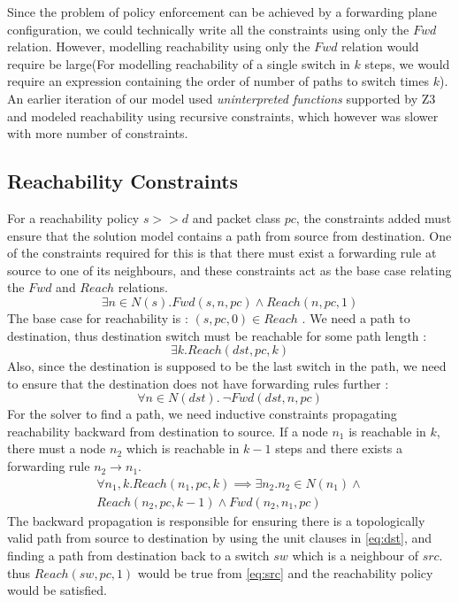 Since the problem of policy enforcement can be achieved by a forwarding plane configuration, we could technically write all the constraints using only the $Fwd$ relation. However, modelling reachability using only the $Fwd$ relation would require be large(For modelling reachability of a single switch in $k$ steps, we would require an expression containing the order of number of paths to switch times $k$). An earlier iteration of our model used \emph{uninterpreted functions} supported by Z3 and modeled reachability using recursive constraints, which however was slower with more number of constraints. 

\subsection{Reachability Constraints} \label{sec:reach}
For a reachability policy $s >> d$ and packet class $pc$, the constraints added must ensure that the solution model contains a path from source from destination. One of the constraints required for this is that there must exist a forwarding rule at source to one of its neighbours, and these constraints act as the base case relating the $Fwd$ and $Reach$ relations. 
\begin{equation} \label{eq:src}
	\exists n \in N(s). Fwd(s, n, pc) \wedge Reach(n, pc, 1)
\end{equation}
The base case for reachability is : $(s, pc,0) \in Reach$ . We need a path to destination, thus destination switch must be reachable for some path length : 
\begin{equation} \label{eq:dst}
	\exists k. Reach(dst, pc, k)
\end{equation}
Also, since the destination is supposed to be the last switch in the path, we need to ensure that the destination does not have forwarding rules further : 
\begin{equation}
	\forall n \in N(dst). \ \neg Fwd(dst, n, pc)
\end{equation}
For the solver to find a path, we need inductive constraints propagating reachability backward from destination to source. If a node $n_1$ is reachable in $k$, there must a node $n_2$ which is reachable in  $k-1$ steps and there exists a forwarding rule $n_2 \rightarrow n_1$.
\begin{multline} \label{eq:bckprop}
\forall n_1,k.  Reach(n_1,pc,k) \implies \exists n_2.  n_2 \in N(n_1) \wedge \\ Reach(n_2,pc,k-1) \wedge Fwd(n_2,n_1,pc)
\end{multline} 
The backward propagation is responsible for ensuring there is a topologically valid path from source to destination by using the unit clauses in \cref{eq:dst}, and finding a path from destination back to a switch $sw$ which is a neighbour of $src$. thus $Reach(sw,pc,1)$ would be true from \cref{eq:src} and the reachability policy would be satisfied. 

